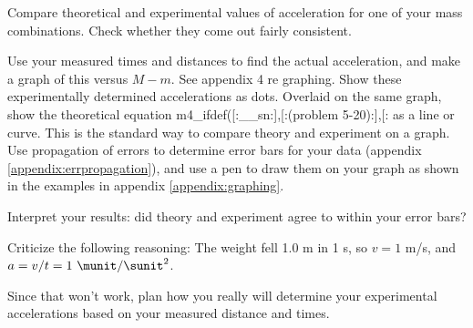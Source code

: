 \selfcheck

Compare theoretical and experimental values of
acceleration for one of your mass combinations.
Check whether they come out fairly consistent.

\analysis

Use your measured times and distances to find the actual
acceleration, and make a graph of this versus $M-m$. 
See appendix 4 re graphing.
Show
these experimentally determined accelerations as dots.
Overlaid on the same graph, show the theoretical
equation %
m4_ifdef([:__sn:],[:(problem 5-20):],[:%
as a line or curve. This is the standard way to
compare theory and experiment on a graph.
Use propagation of errors to determine error bars for
your data (appendix \ref{appendix:errpropagation}), and use a pen to draw them on your graph
as shown in the examples in appendix \ref{appendix:graphing}.

Interpret your results: did theory and experiment agree
to within your error bars?

\prelab

\prelabquestion Criticize the following reasoning: 
The weight fell 1.0
m in 1 s, so $v=1$ m/s, and $a=v/t=1\ \munit/\sunit^2$.

\prelabquestion Since that won't work, plan how you really will
determine your experimental accelerations based on your
measured distance and times.
